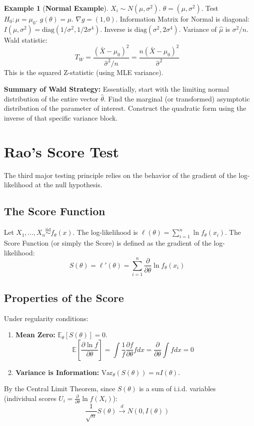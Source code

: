 \documentclass[12pt, a4paper]{article}
\theoremstyle{definition}
\newtheorem{example}{Example}
\newcommand{\E}{\mathbb{E}}
\newcommand{\Var}{\text{Var}}
\newcommand{\iid}{\overset{\text{iid}}{\sim}}
\begin{document}
\begin{example}[\textbf{Normal Example}]
$X_i \sim N(\mu, \sigma^2)$. $\theta = (\mu, \sigma^2)$.
Test $H_0: \mu = \mu_0$.
$g(\theta) = \mu$. $\nabla g = (1, 0)$.
Information Matrix for Normal is diagonal: $I(\mu, \sigma^2) = \text{diag}(1/\sigma^2, 1/2\sigma^4)$.
Inverse is $\text{diag}(\sigma^2, 2\sigma^4)$.
Variance of $\hat{\mu}$ is $\sigma^2/n$.
Wald statistic:
$$ T_W = \frac{(\bar{X} - \mu_0)^2}{\hat{\sigma}^2/n} = \frac{n(\bar{X} - \mu_0)^2}{\hat{\sigma}^2} $$
This is the squared Z-statistic (using MLE variance).
\end{example}

\textbf{Summary of Wald Strategy:}
Essentially, start with the limiting normal distribution of the entire vector $\hat{\theta}$. Find the marginal (or transformed) asymptotic distribution of the parameter of interest. Construct the quadratic form using the inverse of that specific variance block.

\section{Rao's Score Test}

The third major testing principle relies on the behavior of the gradient of the log-likelihood at the null hypothesis.

\subsection{The Score Function}
Let $X_1, \dots, X_n \iid f_\theta(x)$.
The log-likelihood is $\ell(\theta) = \sum_{i=1}^n \ln f_\theta(x_i)$.
The Score Function (or simply the Score) is defined as the gradient of the log-likelihood:
$$ S(\theta) = \ell'(\theta) = \sum_{i=1}^n \frac{\partial}{\partial \theta} \ln f_\theta(x_i) $$

\subsection{Properties of the Score}
Under regularity conditions:
\begin{enumerate}
    \item \textbf{Mean Zero:} $\E_\theta[S(\theta)] = 0$.
    $$ \E\left[\frac{\partial \ln f}{\partial \theta}\right] = \int \frac{1}{f} \frac{\partial f}{\partial \theta} f dx = \frac{\partial}{\partial \theta} \int f dx = 0 $$
    \item \textbf{Variance is Information:} $\Var_\theta(S(\theta)) = n I(\theta)$.
\end{enumerate}
By the Central Limit Theorem, since $S(\theta)$ is a sum of i.i.d. variables (individual scores $U_i = \frac{\partial}{\partial \theta} \ln f(X_i)$):
$$ \frac{1}{\sqrt{n}} S(\theta) \xrightarrow{d} N(0, I(\theta)) $$
\end{document}
